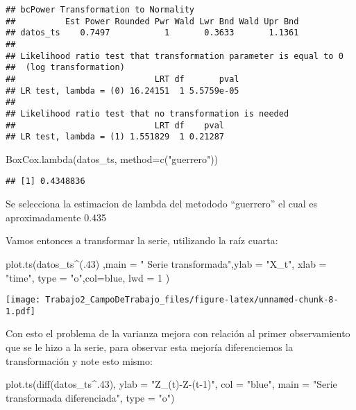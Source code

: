 \documentclass[
]{article}
\newenvironment{Shaded}{\begin{snugshade}}{\end{snugshade}}
\newcommand{\AttributeTok}[1]{\textcolor[rgb]{0.77,0.63,0.00}{#1}}
\newcommand{\DecValTok}[1]{\textcolor[rgb]{0.00,0.00,0.81}{#1}}
\newcommand{\FunctionTok}[1]{\textcolor[rgb]{0.00,0.00,0.00}{#1}}
\newcommand{\NormalTok}[1]{#1}
\newcommand{\SpecialCharTok}[1]{\textcolor[rgb]{0.00,0.00,0.00}{#1}}
\newcommand{\StringTok}[1]{\textcolor[rgb]{0.31,0.60,0.02}{#1}}
\begin{document}
\begin{verbatim}
## bcPower Transformation to Normality 
##          Est Power Rounded Pwr Wald Lwr Bnd Wald Upr Bnd
## datos_ts    0.7497           1       0.3633       1.1361
## 
## Likelihood ratio test that transformation parameter is equal to 0
##  (log transformation)
##                            LRT df       pval
## LR test, lambda = (0) 16.24151  1 5.5759e-05
## 
## Likelihood ratio test that no transformation is needed
##                            LRT df    pval
## LR test, lambda = (1) 1.551829  1 0.21287
\end{verbatim}

\begin{Shaded}
\begin{Highlighting}[]
\FunctionTok{BoxCox.lambda}\NormalTok{(datos\_ts, }\AttributeTok{method=}\FunctionTok{c}\NormalTok{(}\StringTok{"guerrero"}\NormalTok{))}
\end{Highlighting}
\end{Shaded}

\begin{verbatim}
## [1] 0.4348836
\end{verbatim}

Se selecciona la estimacion de lambda del metododo ``guerrero'' el cual
es aproximadamente 0.435

Vamos entonces a transformar la serie, utilizando la raíz cuarta:

\begin{Shaded}
\begin{Highlighting}[]
\FunctionTok{plot.ts}\NormalTok{(datos\_ts}\SpecialCharTok{\^{}}\NormalTok{(.}\DecValTok{43}\NormalTok{) ,}\AttributeTok{main =} \StringTok{" Serie transformada"}\NormalTok{,}\AttributeTok{ylab =} \StringTok{"X\_t"}\NormalTok{, }\AttributeTok{xlab =} \StringTok{"time"}\NormalTok{, }\AttributeTok{type =} \StringTok{"o"}\NormalTok{,}\AttributeTok{col=}\StringTok{\textquotesingle{}blue\textquotesingle{}}\NormalTok{, }\AttributeTok{lwd =} \DecValTok{1}\NormalTok{ )}
\end{Highlighting}
\end{Shaded}

\texttt{[image: Trabajo2\_CampoDeTrabajo\_files/figure-latex/unnamed-chunk-8-1.pdf]}

Con esto el problema de la varianza mejora con relación al primer
observamiento que se le hizo a la serie, para observar esta mejoría
diferenciemos la transformación y note esto mismo:

\begin{Shaded}
\begin{Highlighting}[]
\FunctionTok{plot.ts}\NormalTok{(}\FunctionTok{diff}\NormalTok{(datos\_ts}\SpecialCharTok{\^{}}\NormalTok{.}\DecValTok{43}\NormalTok{), }\AttributeTok{ylab =} \StringTok{"Z\_(t){-}Z{-}(t{-}1)"}\NormalTok{, }\AttributeTok{col =} \StringTok{"blue"}\NormalTok{, }
        \AttributeTok{main =} \StringTok{"Serie transformada diferenciada"}\NormalTok{, }\AttributeTok{type =} \StringTok{"o"}\NormalTok{)}
\end{Highlighting}
\end{Shaded}
\end{document}
